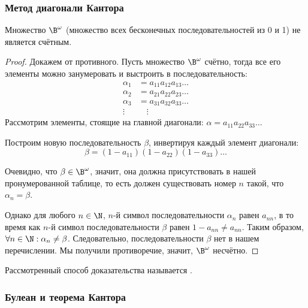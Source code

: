 \subsubsection{Метод диагонали Кантора}

\begin{theorem}
    Множество $\B^\omega$ (множество всех бесконечных последовательностей из 0 и 1) не является счётным.
\end{theorem}

\begin{proof}
    Докажем от противного. Пусть множество \(\B^\omega\) счётно, тогда все его элементы
    можно занумеровать и выстроить в последовательность:
    \begin{align*}
        \alpha_{1} &= a_{11} a_{12} a_{13} \dots \\
        \alpha_{2} &= a_{21} a_{22} a_{23} \dots \\
        \alpha_{3} &= a_{31} a_{32} a_{33} \dots \\
        \vdots & \quad \vdots
    \end{align*}
    Рассмотрим элементы, стоящие на главной диагонали: \(\alpha = a_{11} a_{22} a_{33} \dots\)
    
    Построим новую последовательность \(\beta\), инвертируя каждый элемент диагонали: 
    \[\beta = (1-a_{11})(1-a_{22})(1-a_{33})\dots\]
    
    Очевидно, что \(\beta \in \B^\omega\), значит, она должна присутствовать в нашей пронумерованной таблице, то есть должен существовать номер \(n\) такой, что \(\alpha_{n} = \beta\). 
    
    Однако для любого \(n \in \N\), \(n\)-й символ последовательности \(\alpha_n\) равен \(a_{nn}\), в то время как \(n\)-й символ последовательности \(\beta\) равен \(1 - a_{nn} \neq a_{nn}\). Таким образом, \(\forall n \in \N: \alpha_{n} \neq \beta\). 
    Следовательно, последовательности \(\beta\) нет в нашем перечислении. Мы получили противоречие, значит, \(\B^\omega\) несчётно.
\end{proof}

\begin{remark}
    Рассмотренный способ доказательства называется .
\end{remark}

\subsubsection{Булеан и теорема Кантора}

